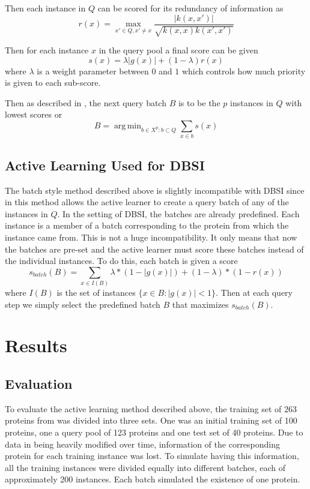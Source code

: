 \documentclass{article}
\DeclareMathOperator*{\argmin}{arg\,min}
\begin{document}
Then each instance in $Q$ can be scored for its redundancy of information as
\[
r(x) = \max_{x' \in Q, x' \neq x} \frac{|k(x,x')|}{\sqrt{k(x,x)k(x', x')}}
\]

Then for each instance $x$ in the query pool a final score can be given
\[
s(x) = \lambda |g(x)| + (1- \lambda) r(x)
\]
where $\lambda$ is a weight parameter between $0$ and $1$ which controls how much priority is given to each sub-score. 

Then as described in \cite{active_learning}, the next query batch $B$ is to be the $p$ instances in $Q$ with lowest scores or
\[
B = \argmin_{b \in X^p : b \subset Q} \sum_{x \in b} s(x)
\]

\subsection*{Active Learning Used for DBSI}
The batch style method described above is slightly incompatible with DBSI since in \cite{active_learning} this method allows the active learner to create a query batch of any of the instances in $Q$. In the setting of DBSI, the batches are already predefined. Each instance is a member of a batch corresponding to the protein from which the instance came from. This is not a huge incompatibility. It only means that now the batches are pre-set and the active learner must score these batches instead of the individual instances. To do this, each batch is given a score
\[
s_{batch}(B) = \sum_{x \in I(B)} \lambda * (1- |g(x)|) + (1-\lambda) * (1 - r(x))
\]
where $I(B)$ is the set of instances $\{x \in B : |g(x)| < 1\}$. Then at each query step we simply select the predefined batch $B$ that maximizes $s_{batch}(B)$.

\section*{Results}
\subsection*{Evaluation}
To evaluate the active learning method described above, the training set of 263 proteins from \cite{dbsi_server} was divided into three sets. One was an initial training set of 100 proteins, one a query pool of 123 proteins and one test set of 40 proteins. Due to data in \cite{dbsi_server} being heavily modified over time, information of the corresponding protein for each training instance was lost. To simulate having this information, all the training instances were divided equally into different batches, each of approximately 200 instances. Each batch simulated the existence of one protein. 
\end{document}
